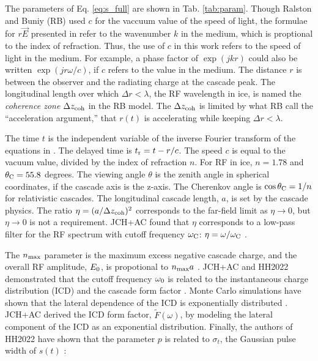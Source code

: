 \documentclass[amsmath,amssymb,aps,prd,10pt,twocolumn,showkeys]{revtex4}
\begin{document}
The parameters of Eq. \ref{eq:s_full} are shown in Tab. \ref{tab:param}.  Though Ralston and Buniy (RB) \cite{10.1103/physrevd.65.016003} used $c$ for the vaccuum value of the speed of light, the formulae for $r \vec{E}$ presented in \cite{10.1103/physrevd.65.016003} refer to the wavenumber $k$ in the medium, which is proptional to the index of refraction. Thus, the use of $c$ in this work refers to the speed of light in the medium.  For example, a phase factor of $\exp(j k r)$ could also be written $\exp(j r \omega/c)$, if $c$ refers to the value in the medium.  The distance $r$ is between the observer and the radiating charge at the cascade peak.  The longitudinal length over which $\Delta r < \lambda$, the RF wavelength in ice, is named the \textit{coherence zone} $\Delta z_{\rm coh}$ in the RB model.  The $\Delta z_{\rm coh}$ is limited by what RB call the ``acceleration argument,'' that $r(t)$ is accelerating while keeping $\Delta r < \lambda$.

The time $t$ is the independent variable of the inverse Fourier transform of the equations in \cite{10.1103/physrevd.65.016003}. The delayed time is $t_{\rm r} = t-r/c$.  The speed $c$ is equal to the vacuum value, divided by the index of refraction $n$.  For RF in ice, $n=1.78$ and $\theta_{\rm C} = 55.8$ degrees.  The viewing angle $\theta$ is the zenith angle in spherical coordinates, if the cascade axis is the z-axis.  The Cherenkov angle is $\cos\theta_{\rm C} = 1/n$ for relativistic cascades.  The longitudinal cascade length, $a$, is set by the cascade physics.  The ratio $\eta = (a/\Delta z_{\rm coh})^2$ corresponds to the far-field limit as $\eta \to 0$, but $\eta \to 0$ is not a requirement.  JCH+AC found that $\eta$ corresponds to a low-pass filter for the RF spectrum with cutoff frequency $\omega_{\rm C}$: $\eta = \omega/\omega_{\rm C}$ \cite{10.1016/j.astropartphys.2017.03.008}.

The $n_{\rm max}$ parameter is the maximum excess negative cascade charge, and the overall RF amplitude, $E_{\rm 0}$, is propotional to $n_{\rm max} a$ \cite{10.1103/physrevd.65.016003}.  JCH+AC and HH2022 demonstrated that the cutoff frequency $\omega_{\rm 0}$ is related to the instantaneous charge distribution (ICD) and the cascade form factor \cite{10.1016/j.astropartphys.2017.03.008,PhysRevD.105.123019}.  Monte Carlo simulations have shown that the lateral dependence of the ICD is exponentially distributed \cite{zhs,10.1016/j.astropartphys.2017.03.008}.  JCH+AC derived the ICD form factor, $\widetilde{F}(\omega)$, by modeling the lateral component of the ICD as an exponential distribution.  Finally, the authors of HH2022 have shown that the parameter $p$ is related to $\sigma_t$, the Gaussian pulse width of $s(t)$ \cite{PhysRevD.105.123019}:
\end{document}
